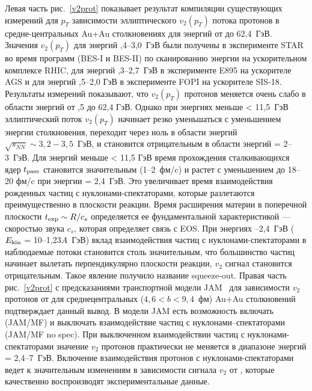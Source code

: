 Левая часть рис.~\ref{v2prot} показывает результат компиляции существующих измерений для  $p_T$ зависимости эллиптического $v_2(p_T)$ потока протонов в средне-центральных  Au+Au столкновениях для энергий от  до 62,4~ГэВ.
Значения $v_2(p_T)$ для энергий  ,4--3,0~ГэВ были получены в эксперименте STAR во время программ (BES-I и BES-II)  по сканированию энергии на ускорительном комплексе RHIC, для энергий  ,3--2,7~ГэВ в эксперименте E895 на ускорителе AGS и  для энергий  ,5--2,0 ГэВ в эксперименте FOPI  на ускорителе SIS-18.
Результаты измерений показывают, что $v_2(p_T)$  протонов меняется очень слабо в области энергий от ,5 до 62,4 ГэВ. 
Однако при энергиях меньше  \snn < 11,5~ГэВ эллиптический поток $v_2(p_T)$ начинает резко уменьшаться с уменьшением энергии столкновения, переходит через ноль в области энергий $\sqrt{ s_{NN} } \sim 3,2-3,5$~ГэВ, и становится отрицательным в области энергий \snn= 2--3~ГэВ. 
Для энергий меньше \snn < 11,5 ГэВ время прохождения сталкивающихся ядер $t_{\rm pass}$  становится значительным (1--2~фм/c) и растет с уменьшением \snn до 18--20 фм/c при энергии \snn = 2,4~ГэВ. 
Это увеличивает время взаимодействия рожденных частиц с нуклонами-спектаторами, которые разлетаются преимущественно в плоскости реакции.
Время расширения материи в поперечной плоскости $t_{\rm exp} \sim R/c_s$  определяется ее фундаментальной характеристикой — скоростью звука $c_s$, которая определяет связь с EOS.  
При энергиях --2,4~ГэВ ($E_{\rm kin}$ = 10--1,23$A$~ГэВ) вклад взаимодействия частиц с нуклонами-спектаторами в наблюдаемые потоки становится столь значительным, что большинство частиц начинает вылетать перпендикулярно плоскости реакции, $v_2$ сигнал становится отрицательным.
Такое явление получило название squeeze-out. 
Правая часть рис.~\ref{v2prot} с предсказаниями транспортной модели JAM~\cite{Zhang:2018wlk} для зависимости $v_2$ протонов от \snn для  среднецентральных ($4,6 < b < 9,4$~фм) Au+Au столкновений подтверждает данный вывод. 
В модели JAM есть возможность включать (JAM/MF) и выключать взаимодействие частиц с нуклонами--спектаторами (JAM/MF no spec). 
При  выключенном взаимодействии частиц с нуклонами-спектаторами значение $v_2$ протонов практически не меняется в диапазоне энергий  \snn = 2,4--7~ГэВ.
Включение  взаимодействия протонов с нуклонами-спектаторами ведет к значительным изменениям в зависимости сигнала  $v_2$ от \snn, которые качественно воспроизводят  экспериментальные данные. 

